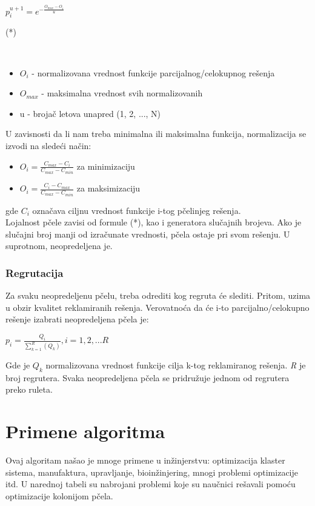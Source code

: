 \documentclass[a4paper]{article}
\begin{document}
{{\centerline{$p_i^{u+1}=e^{-\frac{O_{max}-O_i}{u}}$} \hfill (*)}\\                             
\begin{itemize}
\item$O_i$ - normalizovana vrednost funkcije parcijalnog/celokupnog rešenja
\item $O_{max}$ - maksimalna vrednost svih normalizovanih
\item u - brojač letova unapred (1, 2, ..., N)
\end{itemize}

     U zavisnosti da li nam treba minimalna ili maksimalna funkcija, normalizacija 
se izvodi na sledeći način:
\begin{itemize}
\item$O_i=\frac{C_{max}-C_i}{C_{max}-C_{min}}$ za minimizaciju
\item$O_i=\frac{C_i-C_{max}}{C_{max}-C_{min}}$ za maksimizaciju
\end{itemize}
gde $C_i$ označava ciljnu vrednost funkcije i-tog pčelinjeg rešenja. \\

Lojalnost pčele zavisi od formule (*), kao i generatora slučajnih brojeva. Ako je slučajni broj manji od izračunate vrednosti, pčela ostaje pri svom rešenju. U suprotnom, neopredeljena je\cite{algoritam}.


\subsubsection{Regrutacija}
\label{subsubsec:regrutacija}

Za svaku neopredeljenu pčelu, treba odrediti kog regruta će slediti. Pritom, uzima u obzir kvalitet reklamiranih rešenja. Verovatnoća da će i-to parcijalno/celokupno rešenje izabrati neopredeljena pčela je: \\

\centerline{$p_i = \frac{Q_i}{\sum_{k=1}^{R}(Q_k)},	    i = 1, 2, . . . R$}

Gde je {\em $Q_k$} normalizovana vrednost funkcije cilja k-tog reklamiranog rešenja. {\em R} je broj regrutera. Svaka neopredeljena pčela se pridružuje jednom od regrutera preko ruleta\cite{bcoalg}.


\section{Primene algoritma}
Ovaj algoritam našao je mnoge primene u inžinjerstvu: optimizacija klaster sistema, manufaktura, upravljanje, bioinžinjering, mnogi problemi optimizacije itd.
U narednoj tabeli su nabrojani problemi koje su naučnici rešavali pomoću optimizacije kolonijom pčela.

}
\end{document}
